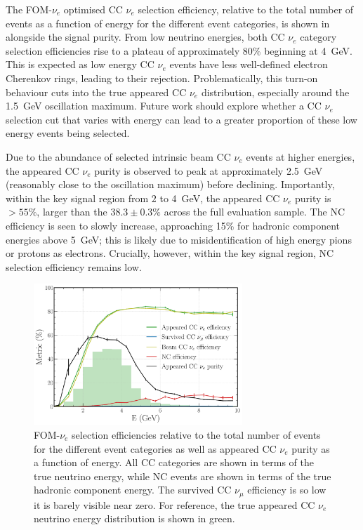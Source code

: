 The FOM-$\nu_e$ optimised CC $\nu_{e}$ selection efficiency, relative to the total number of
events as a function of energy for the different event categories, is shown in
 alongside the signal purity. From low neutrino energies, both CC
$\nu_{e}$ category selection efficiencies rise to a plateau of approximately 80\% beginning at
\SI{4}{GeV}. This is expected as low energy CC $\nu_{e}$ events have less well-defined electron
Cherenkov rings, leading to their rejection. Problematically, this turn-on behaviour cuts into the
true appeared CC $\nu_{e}$ distribution, especially around the \SI{1.5}{\GeV} oscillation maximum.
Future work should explore whether a CC $\nu_{e}$ selection cut that varies with energy can lead
to a greater proportion of these low energy events being selected.

Due to the abundance of selected intrinsic beam CC $\nu_{e}$ events at higher energies, the
appeared CC $\nu_{e}$ purity is observed to peak at approximately \SI{2.5}{\GeV} (reasonably close
to the oscillation maximum) before declining. Importantly, within the key signal region from $2$
to \SI{4}{\GeV}, the appeared CC $\nu_{e}$ purity is $>55\%$, larger than the $38.3\pm0.3\%$
across the full evaluation sample. The NC efficiency is seen to slowly increase, approaching 15\%
for hadronic component energies above \SI{5}{\GeV}; this is likely due to misidentification of
high energy pions or protons as electrons. Crucially, however, within the key signal region, NC
selection efficiency remains low.

\begin{figure} %
    \includegraphics[width=0.7\textwidth]{diagrams/7-results/final_nuel_hists.pdf}
    \caption[Efficiency of the CC $\nu_{e}$ selection as a function of energy]
    {FOM-$\nu_e$ selection efficiencies relative to the total number of events for the different
        event categories as well as appeared CC $\nu_{e}$ purity as a function of energy. All CC
        categories are shown in terms of the true neutrino energy, while NC events are shown in
        terms of the true hadronic component energy. The survived CC $\nu_{\mu}$ efficiency is so
        low it is barely visible near zero. For reference, the true appeared CC $\nu_{e}$ neutrino
        energy distribution is shown in green.}
    \label{fig:final_nuel_hists}
\end{figure}

